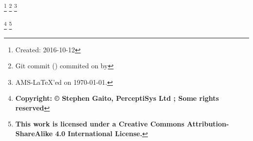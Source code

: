 \author{Stephen Gaito}
\address{PerceptiSys Ltd, 21 Gregory Ave, Coventry, CV3 6DJ, United Kingdom}%
%


\thanks{Created: 2016-10-12}
\thanks{Git commit \gitReferences{} (\gitAbbrevHash{}) commited on \gitAuthorDate{} by \gitAuthorName{}}
\thanks{AMS-\LaTeX{}'ed on \today{}.}

\thanks{\textbf{Copyright: \copyright{} Stephen Gaito, PerceptiSys Ltd \the\year{}; Some rights reserved}}
\thanks{\textbf{This work is licensed under a Creative Commons Attribution-ShareAlike 4.0 International License.}}
